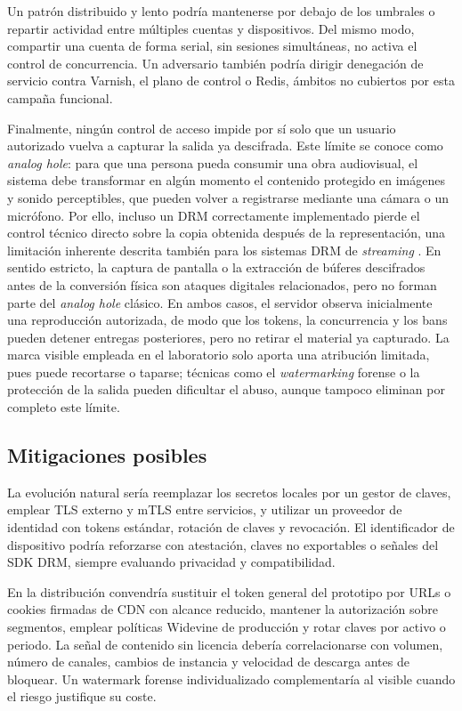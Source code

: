 Un patrón distribuido y lento podría mantenerse por debajo de los umbrales o repartir actividad entre múltiples cuentas y dispositivos. Del mismo modo, compartir una cuenta de forma serial, sin sesiones simultáneas, no activa el control de concurrencia. Un adversario también podría dirigir denegación de servicio contra Varnish, el plano de control o Redis, ámbitos no cubiertos por esta campaña funcional.

Finalmente, ningún control de acceso impide por sí solo que un usuario autorizado vuelva a capturar la salida ya descifrada. Este límite se conoce como \textit{analog hole}: para que una persona pueda consumir una obra audiovisual, el sistema debe transformar en algún momento el contenido protegido en imágenes y sonido perceptibles, que pueden volver a registrarse mediante una cámara o un micrófono. Por ello, incluso un DRM correctamente implementado pierde el control técnico directo sobre la copia obtenida después de la representación, una limitación inherente descrita también para los sistemas DRM de \textit{streaming} \cite{brahmbhatt2009streamingdrm}. En sentido estricto, la captura de pantalla o la extracción de búferes descifrados antes de la conversión física son ataques digitales relacionados, pero no forman parte del \textit{analog hole} clásico. En ambos casos, el servidor observa inicialmente una reproducción autorizada, de modo que los tokens, la concurrencia y los bans pueden detener entregas posteriores, pero no retirar el material ya capturado. La marca visible empleada en el laboratorio solo aporta una atribución limitada, pues puede recortarse o taparse; técnicas como el \textit{watermarking} forense o la protección de la salida pueden dificultar el abuso, aunque tampoco eliminan por completo este límite.

\subsection{Mitigaciones posibles}

La evolución natural sería reemplazar los secretos locales por un gestor de claves, emplear TLS externo y mTLS entre servicios, y utilizar un proveedor de identidad con tokens estándar, rotación de claves y revocación. El identificador de dispositivo podría reforzarse con atestación, claves no exportables o señales del SDK DRM, siempre evaluando privacidad y compatibilidad.

En la distribución convendría sustituir el token general del prototipo por URLs o cookies firmadas de CDN con alcance reducido, mantener la autorización sobre segmentos, emplear políticas Widevine de producción y rotar claves por activo o periodo. La señal de contenido sin licencia debería correlacionarse con volumen, número de canales, cambios de instancia y velocidad de descarga antes de bloquear. Un watermark forense individualizado complementaría al visible cuando el riesgo justifique su coste.

